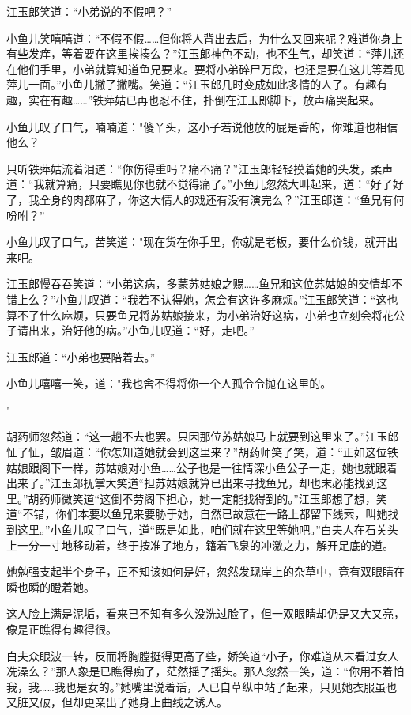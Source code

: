 \documentclass[12pt,oneside]{book}
\begin{document}
江玉郎笑道：``小弟说的不假吧？''

小鱼儿笑嘻嘻道：``不假不假\ldots\ldots 但你将人背出去后，为什么又回来呢？难道你身上有些发痒，等着要在这里挨揍么？''江玉郎神色不动，也不生气，却笑道：``萍儿还在他们手里，小弟就算知道鱼兄要来。要将小弟碎尸万段，也还是要在这儿等着见萍儿一面。''小鱼儿撇了撇嘴。笑道：``江玉郎几时变成如此多情的人了。有趣有趣，实在有趣\ldots\ldots{}''铁萍姑已再也忍不住，扑倒在江玉郎脚下，放声痛哭起来。

小鱼儿叹了口气，喃喃道："傻丫头，这小子若说他放的屁是香的，你难道也相信他么？

只听铁萍姑流着泪道：``你伤得重吗？痛不痛？''江玉郎轻轻摸着她的头发，柔声道：``我就算痛，只要瞧见你也就不觉得痛了。''小鱼儿忽然大叫起来，道：``好了好了，我全身的肉都麻了，你这大情人的戏还有没有演完么？''江玉郎道：``鱼兄有何吩咐？''

小鱼儿叹了口气，苦笑道："现在货在你手里，你就是老板，要什么价钱，就开出来吧。

江玉郎慢吞吞笑道：``小弟这病，多蒙苏姑娘之赐\ldots\ldots 鱼兄和这位苏姑娘的交情却不错上么？''小鱼儿叹道：``我若不认得她，怎会有这许多麻烦。''江玉郎笑道：``这也算不了什么麻烦，只要鱼兄将苏姑娘接来，为小弟治好这病，小弟也立刻会将花公子请出来，治好他的病。''小鱼儿叹道：``好，走吧。''

江玉郎道：``小弟也要陪着去。''

小鱼儿嘻嘻一笑，道："我也舍不得将你一个人孤令令抛在这里的。

"

胡药师忽然道：``这一趟不去也罢。只因那位苏姑娘马上就要到这里来了。''江玉郎怔了怔，皱眉道：``你怎知道她就会到这里来？''胡药师笑了笑，道：``正如这位铁姑娘跟阁下一样，苏姑娘对小鱼\ldots\ldots 公子也是一往情深小鱼公子一走，她也就跟着出来了。''江玉郎抚掌大笑道``担苏姑娘就算已出来寻找鱼兄，却也末必能找到这里。''胡药师微笑道``这倒不劳阁下担心，她一定能找得到的。''江玉郎想了想，笑道``不错，你们本要以鱼兄来要胁于她，自然已故意在一路上都留下线索，叫她找到这里。''小鱼儿叹了口气，道``既是如此，咱们就在这里等她吧。''白夫人在石关头上一分一寸地移动着，终于按准了地方，籍着飞泉的冲激之力，解开足底的道。

她勉强支起半个身子，正不知该如何是好，忽然发现岸上的杂草中，竟有双眼睛在瞬也瞬的瞪着她。

这人脸上满是泥垢，看来已不知有多久没洗过脸了，但一双眼睛却仍是又大又亮，像是正瞧得有趣得很。

白夫众眼波一转，反而将胸膛挺得更高了些，娇笑道``小子，你难道从末看过女人冼澡么？''那人象是已瞧得痴了，茫然摇了摇头。那人忽然一笑，道：``你用不着怕我，我\ldots\ldots 我也是女的。''她嘴里说着话，人已自草纵中站了起来，只见她衣服虽也又脏又破，但却更亲出了她身上曲线之诱人。
\end{document}
